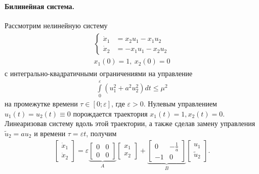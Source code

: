\documentclass[../main.tex]{subfiles}
\begin{document}
\paragraph{Билинейная система.}
Рассмотрим нелинейную систему
\begin{gather}\label{s1:system5}
\begin{gathered}
 \left\{
 \begin{aligned}
 \dot{x}_1 &= x_2 u_1 - x_1 u_2\\
 \dot{x}_2 &= -x_1 u_1 - x_2 u_2
 \end{aligned} \right.
 \\
 x_1(0) = 1, \ x_2(0) = 0
\end{gathered}
\end{gather}
с интегрально-квадратичными ограничениями на управление
\begin{gather*}
 \int \limits_0^{\varepsilon} \left( u_1^2 + a^2 u_2^2\right) dt \leqslant \mu^2
\end{gather*} 
на промежутке времени $ \tau \in \left[0;\varepsilon \right] $, где $ \varepsilon > 0 $.
Нулевым управлением $ u_1(t) = u_2(t) \equiv 0 $ порождается траектория $ x_1(t) = 1, x_2(t) = 0 $.
Линеаризовав систему вдоль этой траектории, а также сделав замену управления $ {\tilde u_2} = a u_2 $ и времени $ \tau =\varepsilon t$, получим
\begin{gather}\label{s1:system5l}
 \begin{bmatrix}
 \dot{x}_1\\
 \dot{x}_2
 \end{bmatrix}= \varepsilon 
 \underbrace{\begin{bmatrix}
 0&0\\
 0&0
 \end{bmatrix}}_A 
 \begin{bmatrix}
 x_1\\
 x_2
 \end{bmatrix} 
 + 
 \underbrace{\begin{bmatrix}
 0&-\frac{1}{a}\\
 -1&0
 \end{bmatrix}}_B
 \begin{bmatrix}
 u_1 \\ 
 \tilde{u}_2
 \end{bmatrix}.
\end{gather}
 
\end{document}
